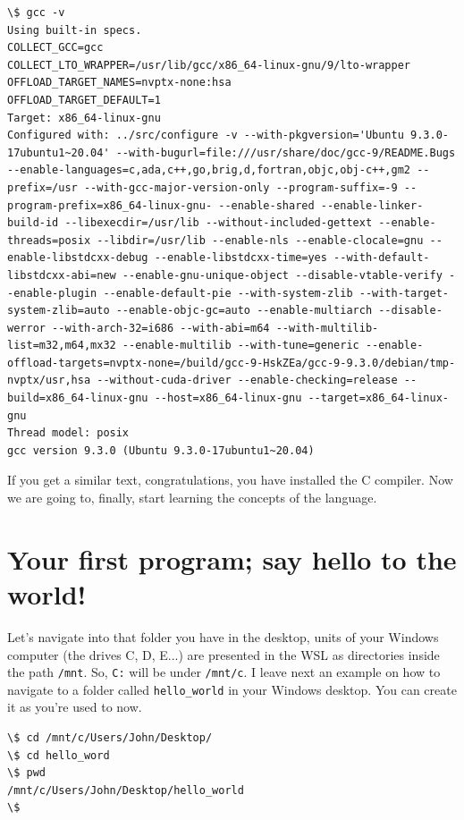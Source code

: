 \documentclass[a4paper]{article}
\begin{document}
\noindent
\begin{minipage}[H]{\linewidth}
\mbox{}
\begin{lstlisting}[style=terminalStyle]
\$ gcc -v
Using built-in specs.
COLLECT_GCC=gcc
COLLECT_LTO_WRAPPER=/usr/lib/gcc/x86_64-linux-gnu/9/lto-wrapper
OFFLOAD_TARGET_NAMES=nvptx-none:hsa
OFFLOAD_TARGET_DEFAULT=1
Target: x86_64-linux-gnu
Configured with: ../src/configure -v --with-pkgversion='Ubuntu 9.3.0-17ubuntu1~20.04' --with-bugurl=file:///usr/share/doc/gcc-9/README.Bugs --enable-languages=c,ada,c++,go,brig,d,fortran,objc,obj-c++,gm2 --prefix=/usr --with-gcc-major-version-only --program-suffix=-9 --program-prefix=x86_64-linux-gnu- --enable-shared --enable-linker-build-id --libexecdir=/usr/lib --without-included-gettext --enable-threads=posix --libdir=/usr/lib --enable-nls --enable-clocale=gnu --enable-libstdcxx-debug --enable-libstdcxx-time=yes --with-default-libstdcxx-abi=new --enable-gnu-unique-object --disable-vtable-verify --enable-plugin --enable-default-pie --with-system-zlib --with-target-system-zlib=auto --enable-objc-gc=auto --enable-multiarch --disable-werror --with-arch-32=i686 --with-abi=m64 --with-multilib-list=m32,m64,mx32 --enable-multilib --with-tune=generic --enable-offload-targets=nvptx-none=/build/gcc-9-HskZEa/gcc-9-9.3.0/debian/tmp-nvptx/usr,hsa --without-cuda-driver --enable-checking=release --build=x86_64-linux-gnu --host=x86_64-linux-gnu --target=x86_64-linux-gnu
Thread model: posix
gcc version 9.3.0 (Ubuntu 9.3.0-17ubuntu1~20.04)
\end{lstlisting}
\end{minipage}

If you get a similar text, congratulations, you have installed the C compiler.
Now we are going to, finally, start learning the concepts of the language.

\section{Your first program; say hello to the world!}

Let's navigate into that folder you have in the desktop, units of your Windows
computer (the drives C, D, E...) are presented in the WSL as directories inside
the path \verb!/mnt!. So, \verb!C:! will be under \verb!/mnt/c!. I leave next an
example on how to navigate to a folder called \verb!hello_world! in your Windows
desktop. You can create it as you're used to now.

\noindent
\begin{minipage}[H]{\linewidth}
\mbox{}
\begin{lstlisting}[style=terminalStyle]
\$ cd /mnt/c/Users/John/Desktop/
\$ cd hello_word
\$ pwd
/mnt/c/Users/John/Desktop/hello_world
\$
\end{lstlisting}
\end{minipage}
\end{document}
